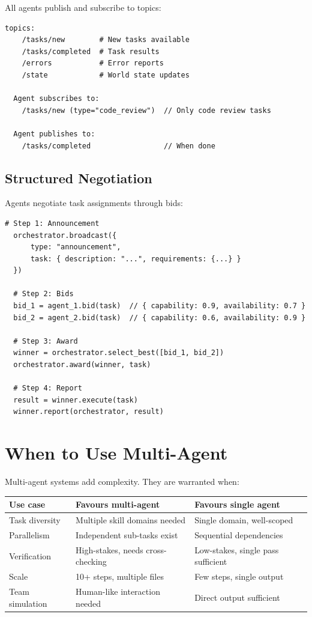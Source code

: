 All agents publish and subscribe to topics:

\begin{lstlisting}[caption=Pub/sub message bus]
  topics:
    /tasks/new        # New tasks available
    /tasks/completed  # Task results
    /errors           # Error reports
    /state            # World state updates

  Agent subscribes to:
    /tasks/new (type="code_review")  // Only code review tasks

  Agent publishes to:
    /tasks/completed                 // When done
\end{lstlisting}

\subsection{Structured Negotiation}

Agents negotiate task assignments through bids:

\begin{lstlisting}[caption=Contract net protocol]
  # Step 1: Announcement
  orchestrator.broadcast({
      type: "announcement",
      task: { description: "...", requirements: {...} }
  })

  # Step 2: Bids
  bid_1 = agent_1.bid(task)  // { capability: 0.9, availability: 0.7 }
  bid_2 = agent_2.bid(task)  // { capability: 0.6, availability: 0.9 }

  # Step 3: Award
  winner = orchestrator.select_best([bid_1, bid_2])
  orchestrator.award(winner, task)

  # Step 4: Report
  result = winner.execute(task)
  winner.report(orchestrator, result)
\end{lstlisting}

\section{When to Use Multi-Agent}

Multi-agent systems add complexity. They are warranted when:

\begin{longtable}{p{4cm}p{5cm}p{5cm}}
	\toprule
	\textbf{Use case} & \textbf{Favours multi-agent}      & \textbf{Favours single agent}      \\
	\midrule
	Task diversity    & Multiple skill domains needed     & Single domain, well-scoped         \\
	Parallelism       & Independent sub-tasks exist       & Sequential dependencies            \\
	Verification      & High-stakes, needs cross-checking & Low-stakes, single pass sufficient \\
	Scale             & 10+ steps, multiple files         & Few steps, single output           \\
	Team simulation   & Human-like interaction needed     & Direct output sufficient           \\
	\bottomrule
\end{longtable}

